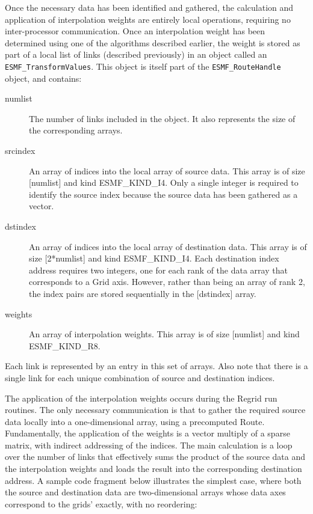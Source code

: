 Once the necessary data has been identified and gathered, the calculation and
application of interpolation weights are entirely local operations, requiring no
inter-processor communication.  Once an interpolation weight has been determined
using one of the algorithms described earlier, the weight is stored as part of a
local list of links (described previously) in an object called an
{\tt ESMF\_TransformValues}.  This object is itself part of the 
{\tt ESMF\_RouteHandle} object, and contains:
\begin{description}
   \item [numlist]
         The number of links included in the object.  It also represents the
         size of the corresponding arrays.
   \item [srcindex]
         An array of indices into the local array of source data.
         This array is of size [numlist] and kind ESMF_KIND_I4.  Only a single
         integer is required to identify the source index because the source data
         has been gathered as a vector.
   \item [dstindex]
         An array of indices into the local array of destination data.
         This array is of size [2*numlist] and kind ESMF_KIND_I4.  Each
         destination index address requires two integers, one for each rank
         of the data array that corresponds to a Grid axis.  However, rather
         than being an array of rank 2, the index pairs are stored sequentially
         in the [dstindex] array.
   \item [weights]
         An array of interpolation weights.  This array is of size [numlist] and
         kind ESMF_KIND_R8.
\end{description}
Each link is represented by an entry in this set of arrays.  Also note that there
is a single link for each unique combination of source and destination indices.

The application of the interpolation weights occurs during the Regrid run
routines.  The only necessary communication is that to gather the required source
data locally into a one-dimensional array, using a precomputed Route.
Fundamentally, the application of the weights is a vector multiply of a sparse
matrix, with indirect addressing of the indices.  The main calculation is a loop
over the number of links that effectively sums the product of the source data and
the interpolation weights and loads the result into the corresponding destination
address.  A sample code fragment below illustrates the simplest case, where both
the source and destination data are two-dimensional arrays whose data axes 
correspond to the grids' exactly, with no reordering:

